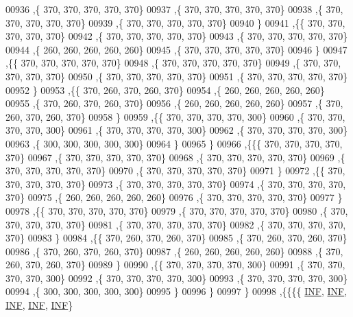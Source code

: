 \begin{DoxyCode}
00936    ,\{   370,   370,   370,   370,   370\}
00937    ,\{   370,   370,   370,   370,   370\}
00938    ,\{   370,   370,   370,   370,   370\}
00939    ,\{   370,   370,   370,   370,   370\}
00940    \}
00941   ,\{\{   370,   370,   370,   370,   370\}
00942    ,\{   370,   370,   370,   370,   370\}
00943    ,\{   370,   370,   370,   370,   370\}
00944    ,\{   260,   260,   260,   260,   260\}
00945    ,\{   370,   370,   370,   370,   370\}
00946    \}
00947   ,\{\{   370,   370,   370,   370,   370\}
00948    ,\{   370,   370,   370,   370,   370\}
00949    ,\{   370,   370,   370,   370,   370\}
00950    ,\{   370,   370,   370,   370,   370\}
00951    ,\{   370,   370,   370,   370,   370\}
00952    \}
00953   ,\{\{   370,   260,   370,   260,   370\}
00954    ,\{   260,   260,   260,   260,   260\}
00955    ,\{   370,   260,   370,   260,   370\}
00956    ,\{   260,   260,   260,   260,   260\}
00957    ,\{   370,   260,   370,   260,   370\}
00958    \}
00959   ,\{\{   370,   370,   370,   370,   300\}
00960    ,\{   370,   370,   370,   370,   300\}
00961    ,\{   370,   370,   370,   370,   300\}
00962    ,\{   370,   370,   370,   370,   300\}
00963    ,\{   300,   300,   300,   300,   300\}
00964    \}
00965   \}
00966  ,\{\{\{   370,   370,   370,   370,   370\}
00967    ,\{   370,   370,   370,   370,   370\}
00968    ,\{   370,   370,   370,   370,   370\}
00969    ,\{   370,   370,   370,   370,   370\}
00970    ,\{   370,   370,   370,   370,   370\}
00971    \}
00972   ,\{\{   370,   370,   370,   370,   370\}
00973    ,\{   370,   370,   370,   370,   370\}
00974    ,\{   370,   370,   370,   370,   370\}
00975    ,\{   260,   260,   260,   260,   260\}
00976    ,\{   370,   370,   370,   370,   370\}
00977    \}
00978   ,\{\{   370,   370,   370,   370,   370\}
00979    ,\{   370,   370,   370,   370,   370\}
00980    ,\{   370,   370,   370,   370,   370\}
00981    ,\{   370,   370,   370,   370,   370\}
00982    ,\{   370,   370,   370,   370,   370\}
00983    \}
00984   ,\{\{   370,   260,   370,   260,   370\}
00985    ,\{   370,   260,   370,   260,   370\}
00986    ,\{   370,   260,   370,   260,   370\}
00987    ,\{   260,   260,   260,   260,   260\}
00988    ,\{   370,   260,   370,   260,   370\}
00989    \}
00990   ,\{\{   370,   370,   370,   370,   300\}
00991    ,\{   370,   370,   370,   370,   300\}
00992    ,\{   370,   370,   370,   370,   300\}
00993    ,\{   370,   370,   370,   370,   300\}
00994    ,\{   300,   300,   300,   300,   300\}
00995    \}
00996   \}
00997  \}
00998 ,\{\{\{\{   \mbox{\hyperlink{1_88_84__epars_8h_a12c2040f25d8e3a7b9e1c2024c618cb6}{INF}},   \mbox{\hyperlink{1_88_84__epars_8h_a12c2040f25d8e3a7b9e1c2024c618cb6}{INF}},   \mbox{\hyperlink{1_88_84__epars_8h_a12c2040f25d8e3a7b9e1c2024c618cb6}{INF}},   \mbox{\hyperlink{1_88_84__epars_8h_a12c2040f25d8e3a7b9e1c2024c618cb6}{INF}},   \mbox{\hyperlink{1_88_84__epars_8h_a12c2040f25d8e3a7b9e1c2024c618cb6}{INF}}\}

\end{DoxyCode}
